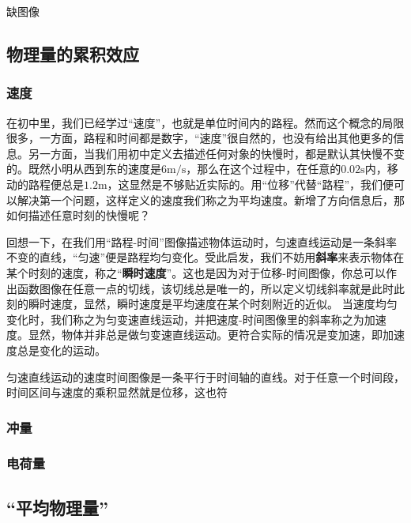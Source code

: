 
\begin{issues}
\issueTODO 缺图像
\end{issues}

\subsection{物理量的累积效应}

\subsubsection{速度}
在初中里，我们已经学过“速度”，也就是单位时间内的路程。然而这个概念的局限很多，一方面，路程和时间都是数字，“速度”很自然的，也没有给出其他更多的信息。另一方面，当我们用初中定义去描述任何对象的快慢时，都是默认其快慢不变的。既然小明从西到东的速度是$6 \mathrm{m/s}$，那么在这个过程中，在任意的$0.02\mathrm s$内，移动的路程便总是$1.2\mathrm m$，这显然是不够贴近实际的。用“位移”代替“路程”，我们便可以解决第一个问题，这样定义的速度我们称之为平均速度。新增了方向信息后，那如何描述任意时刻的快慢呢？

回想一下，在我们用“路程-时间”图像描述物体运动时，匀速直线运动是一条斜率不变的直线，“匀速”便是路程均匀变化。受此启发，我们不妨用\textbf{斜率}来表示物体在某个时刻的速度，称之“\textbf{瞬时速度}”。这也是因为对于位移-时间图像，你总可以作出函数图像在任意一点的切线，该切线总是唯一的，所以定义切线斜率就是此时此刻的瞬时速度，显然，瞬时速度是平均速度在某个时刻附近的近似。
当速度均匀变化时，我们称之为匀变速直线运动，并把速度-时间图像里的斜率称之为加速度。显然，物体并非总是做匀变速直线运动。更符合实际的情况是变加速，即加速度总是变化的运动。

匀速直线运动的速度时间图像是一条平行于时间轴的直线。对于任意一个时间段，时间区间与速度的乘积显然就是位移，这也符
\subsubsection{冲量}
\subsubsection{电荷量}
\subsection{“平均物理量”}